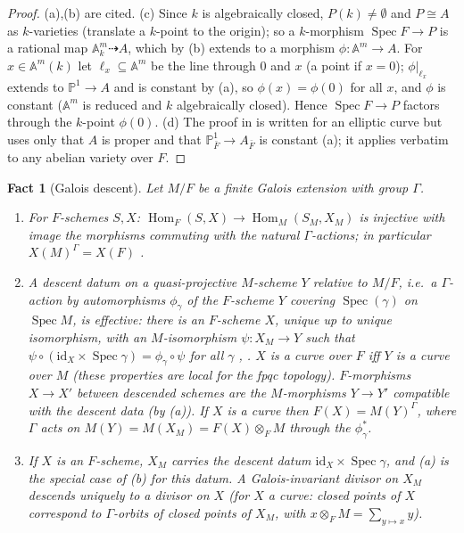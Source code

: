 \documentclass[11pt]{amsart}
\newtheorem{fact}[theorem]{Fact}
\theoremstyle{definition}
\theoremstyle{remark}
\newcommand{\A}{\mathbb A}
\newcommand{\PP}{\mathbb P}
\newcommand{\Hom}{\operatorname{Hom}}
\newcommand{\Spec}{\operatorname{Spec}}
\begin{document}
\begin{proof}
(a),(b) are cited. (c) Since $k$ is algebraically closed, $P(k)\ne\emptyset$ and $P\cong A$
as $k$-varieties (translate a $k$-point to the origin); so a $k$-morphism
$\Spec F\to P$ is a rational map $\A^m_k\dashrightarrow A$, which by (b) extends to a
morphism $\phi\colon\A^m\to A$. For $x\in\A^m(k)$ let $\ell_x\subseteq\A^m$ be the line
through $0$ and $x$ (a point if $x=0$); $\phi|_{\ell_x}$ extends to $\PP^1\to A$ and is
constant by (a), so $\phi(x)=\phi(0)$ for all $x$, and $\phi$ is constant ($\A^m$ is
reduced and $k$ algebraically closed). Hence $\Spec F\to P$ factors through the
$k$-point $\phi(0)$. (d) The proof in \cite{P} is written for an elliptic curve but uses
only that $A$ is proper and that $\PP^1_{\bar F}\to A_{\bar F}$ is constant (a); it
applies verbatim to any abelian variety over $F$.
\end{proof}

\begin{fact}[Galois descent]\label{fact:descent}
Let $M/F$ be a finite Galois extension with group $\Gamma$.
\begin{enumerate}[label=\textup{(\alph*)}]
\item For $F$-schemes $S,X$: $\Hom_F(S,X)\to\Hom_M(S_M,X_M)$ is injective with image
the morphisms commuting with the natural $\Gamma$-actions; in particular
$X(M)^\Gamma=X(F)$ \cite[6.1, Thm.~6 and 6.2, Example B]{BLR}.
\item A descent datum on a quasi-projective $M$-scheme $Y$ relative to $M/F$, i.e.\ a
$\Gamma$-action by automorphisms $\phi_\gamma$ of the $F$-scheme $Y$ covering
$\Spec(\gamma)$ on $\Spec M$, is effective: there is an $F$-scheme $X$, unique up to
unique isomorphism, with an $M$-isomorphism $\psi\colon X_M\to Y$ such that
$\psi\circ(\mathrm{id}_X\times\Spec\gamma)=\phi_\gamma\circ\psi$ for all $\gamma$
\cite[6.2, Example B]{BLR}, \cite[V.20, Prop.~12]{SeAG}. $X$ is a curve over $F$ iff $Y$
is a curve over $M$ (these properties are local for the fpqc topology). $F$-morphisms
$X\to X'$ between descended schemes are the $M$-morphisms $Y\to Y'$ compatible with the
descent data (by (a)). If $X$ is a curve then $F(X)=M(Y)^\Gamma$, where $\Gamma$ acts on
$M(Y)=M(X_M)=F(X)\otimes_FM$ through the $\phi_\gamma^*$.
\item If $X$ is an $F$-scheme, $X_M$ carries the descent datum $\mathrm{id}_X\times\Spec\gamma$,
and (a) is the special case of (b) for this datum. A Galois-invariant divisor on $X_M$
descends uniquely to a divisor on $X$ (for $X$ a curve: closed points of $X$ correspond
to $\Gamma$-orbits of closed points of $X_M$, with $x\otimes_FM=\sum_{y\mapsto x}y$).
\end{enumerate}
\end{fact}
\end{document}
